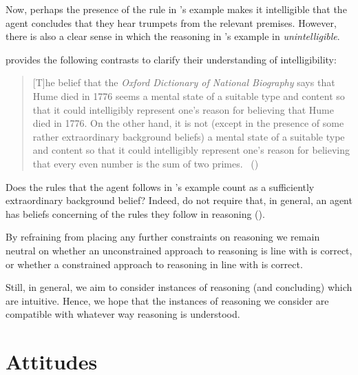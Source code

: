 \begin{note}[No constraints]
  Now, perhaps the presence of the rule in \citeauthor{Broome:2013aa}'s example makes it intelligible that the agent concludes that they hear trumpets from the relevant premises.
  However, there is also a clear sense in which the reasoning in \citeauthor{Broome:2013aa}'s example in \emph{unintelligible}.

  \citeauthor{Wedgwood:2006ui} provides the following contrasts to clarify their understanding of intelligibility:

  \begin{quote}
    [T]he belief that the \emph{Oxford Dictionary of National Biography} says that Hume died in 1776 seems a mental state of a suitable type and content so that it could intelligibly represent one's reason for believing that Hume died in 1776.
    On the other hand, it is not (except in the presence of some rather extraordinary background beliefs) a mental state of a suitable type and content so that it could intelligibly represent one's reason for believing that every even number is the sum of two primes.%
    \mbox{ }\hfill\mbox{(\citeyear[662]{Wedgwood:2006ui})}
  \end{quote}

  Does the rules that the agent follows in \citeauthor{Broome:2013aa}'s example count as a sufficiently extraordinary background belief?
  Indeed, \citeauthor{Broome:2013aa} do not require that, in general, an agent has beliefs concerning of the rules they follow in reasoning (\citeyear[Cf.][\S13.2]{Broome:2013aa}).
\end{note}

\begin{note}
  By refraining from placing any further constraints on reasoning we remain neutral on whether an unconstrained approach to reasoning is line with \citeauthor{Broome:2013aa} is correct, or whether a constrained approach to reasoning in line with \citeauthor{Wedgwood:2006ui} is correct.

  Still, in general, we aim to consider instances of reasoning (and concluding) which are intuitive.
  Hence, we hope that the instances of reasoning we consider are compatible with whatever way reasoning is understood.
\end{note}

\section{Attitudes}

